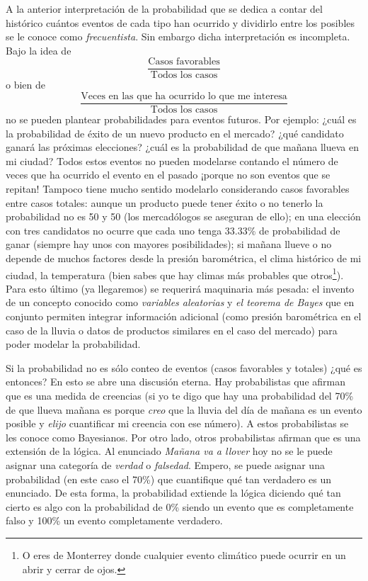 \documentclass[
]{book}
\begin{document}
A la anterior interpretación de la probabilidad que se dedica a contar del histórico cuántos eventos de cada tipo han ocurrido y dividirlo entre los posibles se le conoce como \emph{frecuentista}. Sin embargo dicha interpretación es incompleta. Bajo la idea de\\
\[
\dfrac{\text{Casos favorables}}{\text{Todos los casos}}
\]
o bien de
\[
\dfrac{\text{Veces en las que ha ocurrido lo que me interesa}}{\text{Todos los casos}}
\]
no se pueden plantear probabilidades para eventos futuros. Por ejemplo: ¿cuál es la probabilidad de éxito de un nuevo producto en el mercado? ¿qué candidato ganará las próximas elecciones? ¿cuál es la probabilidad de que mañana llueva en mi ciudad? Todos estos eventos no pueden modelarse contando el número de veces que ha ocurrido el evento en el pasado ¡porque no son eventos que se repitan! Tampoco tiene mucho sentido modelarlo considerando casos favorables entre casos totales: aunque un producto puede tener éxito o no tenerlo la probabilidad no es 50 y 50 (los mercadólogos se aseguran de ello); en una elección con tres candidatos no ocurre que cada uno tenga 33.33\% de probabilidad de ganar (siempre hay unos con mayores posibilidades); si mañana llueve o no depende de muchos factores desde la presión barométrica, el clima histórico de mi ciudad, la temperatura (bien sabes que hay climas más probables que otros\footnote{O eres de Monterrey donde cualquier evento climático puede ocurrir en un abrir y cerrar de ojos.}). Para esto último (ya llegaremos) se requerirá maquinaria más pesada: el invento de un concepto conocido como \emph{variables aleatorias} y \emph{el teorema de Bayes} que en conjunto permiten integrar información adicional (como presión barométrica en el caso de la lluvia o datos de productos similares en el caso del mercado) para poder modelar la probabilidad.

Si la probabilidad no es sólo conteo de eventos (casos favorables y totales) ¿qué es entonces? En esto se abre una discusión eterna. Hay probabilistas que afirman que es una medida de creencias (si yo te digo que hay una probabilidad del 70\% de que llueva mañana es porque \emph{creo} que la lluvia del día de mañana es un evento posible y \emph{elijo} cuantificar mi creencia con ese número). A estos probabilistas se les conoce como Bayesianos. Por otro lado, otros probabilistas afirman que es una extensión de la lógica. Al enunciado \emph{Mañana va a llover} hoy no se le puede asignar una categoría de \emph{verdad} o \emph{falsedad}. Empero, se puede asignar una probabilidad (en este caso el 70\%) que cuantifique qué tan verdadero es un enunciado. De esta forma, la probabilidad extiende la lógica diciendo qué tan cierto es algo con la probabilidad de 0\% siendo un evento que es completamente falso y 100\% un evento completamente verdadero.
\end{document}
